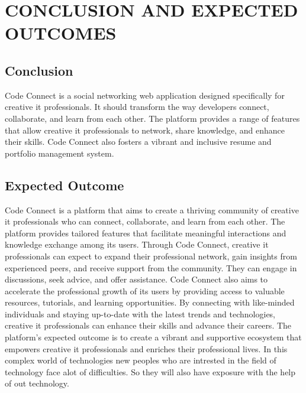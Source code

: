 \chapter{CONCLUSION AND EXPECTED OUTCOMES}
\section{Conclusion}
Code Connect is a social networking web application designed specifically for creative it professionals. It should transform the way developers connect, collaborate, and learn from each other. The platform provides a range of features that allow creative it professionals to network, share knowledge, and enhance their skills. Code Connect also fosters a vibrant and inclusive resume and portfolio management system.

\section{Expected Outcome}
Code Connect is a platform that aims to create a thriving community of creative it professionals who can connect, collaborate, and learn from each other. The platform provides tailored features that facilitate meaningful interactions and knowledge exchange among its users. Through Code Connect, creative it professionals can expect to expand their professional network, gain insights from experienced peers, and receive support from the community. They can engage in discussions, seek advice, and offer assistance. Code Connect also aims to accelerate the professional growth of its users by providing access to valuable resources, tutorials, and learning opportunities. By connecting with like-minded individuals and staying up-to-date with the latest trends and technologies, creative it professionals can enhance their skills and advance their careers. The platform's expected outcome is to create a vibrant and supportive ecosystem that empowers creative it professionals and enriches their professional lives.
In this complex world of technologies new peoples who are intrested in the field of technology face alot of difficulties.
So they will also have exposure with the help of out technology.